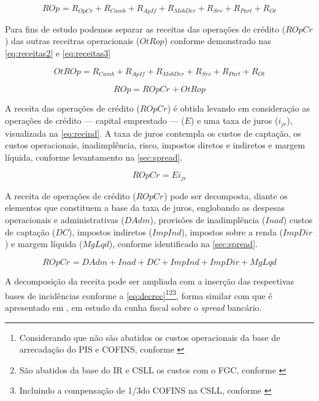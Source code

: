 \documentclass[
  12pt,
  12pt,
  openright,
  oneside,
  a4paper,
  chapter=TITLE,
  section=TITLE,
  subsection=TITLE,
  subsubsection=TITLE,
  portugues,
  sumario=tradicional]{abntex2}
\begin{document}
\begin{apendicesenv}
\begin{equation}\label{eq:receitas}
ROp_{} = R_{OpCr} + R_{Camb} + R_{ApIf} + R_{MobDer} + R_{Srv} + R_{Part} + R_{Ot}
\end{equation}


Para fins de estudo podemos separar as receitas das operações de crédito ($ROpCr_{}$) das outras receitras operacionais ($OtRop$) conforme demonstrado nas \autoref{eq:receitas2} e  \autoref{eq:receitas3} 


\begin{equation}\label{eq:receitas2}
OtROp = R_{Camb} + R_{ApIf} + R_{MobDer} + R_{Srv} + R_{Part} + R_{Ot} 
\end{equation}

\begin{equation}\label{eq:receitas3}
ROp = ROpCr_{} + OtRop
\end{equation}

A receita das operações de crédito ($ROpCr$) é obtida levando em  consideração as operações de crédito — capital emprestado — ($E$) e uma taxa de juros ($i_{jr}$), visualizada na \autoref{eq:recind}. A taxa de juros contempla os custos de captação, os custos operacionais, inadimplência, risco, impostos diretos e indiretos e margem líquida, conforme levantamento na \autoref{sec:spread}.



\begin{equation}\label{eq:recind}
ROpCr_{} = Ei_{jr}
\end{equation}



A receita de operações de crédito ($ROpCr_{}$) pode ser decomposta, diante os elementos que constituem a base da taxa de juros,  englobando as despesas operacionais e administrativas ($DAdm$), provisões de inadimplência ($Inad$) custos de captação ($DC$), impostos indiretos ($ImpInd$), impostos sobre a renda ($ImpDir$) e margem líquida ($MgLqd$), conforme identificado na \autoref{sec:spread}.



\begin{equation}
ROpCr_{} = DAdm + Inad + DC + ImpInd + ImpDir + MgLqd
\end{equation}


A decomposição da receita pode ser ampliada com a inserção das respectivas bases de incidências conforme a \autoref{eq:decrec}\footnote{Considerando que não são abatidos os custos operacionais da base de arrecadação do PIS e COFINS, conforme \textcite{cardoso:1999}}\footnote{São abatidos da base do IR e CSLL os custos com o FGC, conforme \textcite{cardoso:1999}}\footnote{Incluindo a compensação de 1/3do COFINS na CSLL, conforme \textcite{cardoso:1999}}, forma similar com que é apresentado em \textcite{cardoso:1999}, em estudo da cunha fiscal sobre o \emph{spread} bancário. 


\end{apendicesenv}
\end{document}
